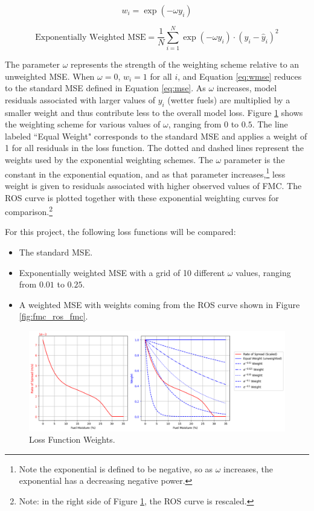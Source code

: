 \documentclass[11pt]{article}%
\begin{document}
\begin{equation}
    \label{eq:weights}
    w_i = \exp(-\omega y_i)
\end{equation}

\begin{equation}
    \label{eq:wloss}
    \text{Exponentially Weighted MSE} = \frac{1}{N}\sum_{i=1}^N \exp(-\omega y_i)\cdot (y_i - \hat y_i)^2
\end{equation}

The parameter $\omega$ represents the strength of the weighting scheme relative to an unweighted MSE. When $\omega = 0$, $w_i = 1$ for all $i$, and Equation \ref{eq:wmse} reduces to the standard MSE defined in Equation \ref{eq:mse}. As $\omega$ increases, model residuals associated with larger values of $y_i$ (wetter fuels) are multiplied by a smaller weight and thus contribute less to the overall model loss. Figure \ref{fig:weights} shows the weighting scheme for various values of $\omega$, ranging from $0$ to $0.5$. The line labeled ``Equal Weight" corresponds to the standard MSE and applies a weight of 1 for all residuals in the loss function. The dotted and dashed lines represent the weights used by the exponential weighting schemes. The $\omega$ parameter is the constant in the exponential equation, and as that parameter increases,\footnote{Note the exponential is defined to be negative, so as $\omega$ increases, the exponential has a decreasing negative power.} less weight is given to residuals associated with higher observed values of FMC. The ROS curve is plotted together with these exponential weighting curves for comparison.\footnote{Note: in the right side of Figure \ref{fig:weights}, the ROS curve is rescaled.}


For this project, the following loss functions will be compared:

\begin{itemize}
    \item The standard MSE.
    \item Exponentially weighted MSE with a grid of 10 different $\omega$ values, ranging from $0.01$ to $0.25$.
    \item A weighted MSE with weights coming from the ROS curve shown in Figure \ref{fig:fmc_ros_fmc}.
\end{itemize}

\begin{figure}[ht]
    \centering
    \includegraphics[width=1.1\textwidth]{images/weights.png}
    \caption{Loss Function Weights.}
    \label{fig:weights}
\end{figure}
\end{document}
